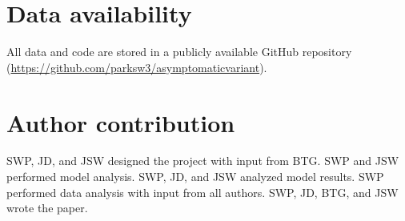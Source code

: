 \documentclass[12pt]{article}
\begin{document}
\section*{Data availability}

All data and code are stored in a publicly available GitHub repository (\url{https://github.com/parksw3/asymptomaticvariant}).

\section*{Author contribution}

SWP, JD, and JSW designed the project with input from BTG.
SWP and JSW performed model analysis.
SWP, JD,  and JSW analyzed model results.
SWP performed data analysis with input from all authors.
SWP, JD, BTG, and JSW wrote the paper.

\pagebreak
\end{document}

